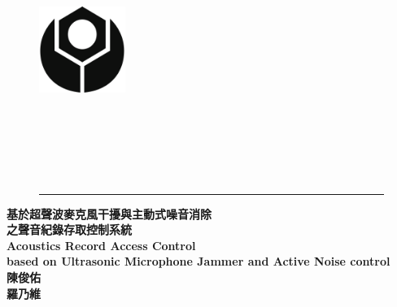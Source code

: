 \begin{titlepage}
    \begin{singlespace}
        \begin{center}
            \begin{figure}[htb]
                \begin{minipage}[c]{0cm} 
                    \raggedright
                    \includegraphics[width=1.1in]{style/logo.pdf}
                \end{minipage}
                \begin{minipage}[c]{\textwidth}
                    \centering
                    \\
                    \vspace{1cm}
                    \\
                    \vspace{1cm}
                    \\
                \end{minipage}
                \begin{minipage}[b]{\textwidth}
                    \raggedleft
                    \vspace{1cm}
                    \\
                \end{minipage}
                \rule{16cm}{3pt}
            \end{figure}
            \vspace{1.5cm}
            \bf\LARGE{基於超聲波麥克風干擾與主動式噪音消除\\之聲音紀錄存取控制系統}\\
            \vspace{0.5cm}
            \bf\LARGE{Acoustics Record Access Control\\based on Ultrasonic Microphone Jammer and Active Noise control}\\
            \vfill
            \hspace{4.5cm}  \Large{陳俊佑} \hfill \makebox[0cm][r]{}\\
            \vspace{0.5cm}
            \hspace{4.5cm}  \Large{羅乃維}  \hfill \makebox[0cm][r]{}\\
            \vfill
        \end{center}
    \end{singlespace}
\end{titlepage}
\clearpage
\restoregeometry